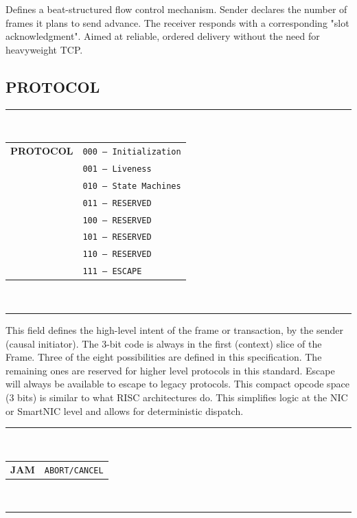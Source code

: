 \documentclass[../HFT-main.tex]{subfiles}
\begin{document}

Defines a beat-structured flow control mechanism.  Sender declares the number of frames it plans to send advance. The receiver responds with a corresponding "slot acknowledgment".  Aimed at reliable, ordered delivery without the need for heavyweight TCP.


\subsection{PROTOCOL}

\begin{margintable}
  \centering
  \vspace{12pt} 
  \footnotesize
  \rule{5.4cm}{0.8pt}\\
  \begin{tabular}{@{}cl@{}}
    \textbf{PROTOCOL} & \texttt{000 — Initialization} \\
                      & \texttt{001 — Liveness} \\
                      & \texttt{010 — State Machines} \\
                      & \texttt{011 — RESERVED} \\
                      & \texttt{100 — RESERVED} \\
                      & \texttt{101 — RESERVED} \\
                      & \texttt{110 — RESERVED} \\
                      & \texttt{111 — ESCAPE} \\
  \end{tabular}\\
  \rule{5.4cm}{0.6pt}
\end{margintable}

This field defines the high-level intent of the frame or transaction, by the sender (causal initiator). The 3-bit code is always in the first (context) slice of the Frame. Three of the eight possibilities are defined in this specification. The remaining ones are reserved for higher level protocols in this standard.  Escape will always be available to escape to legacy protocols. This compact opcode space (3 bits) is similar to what RISC architectures do. This simplifies logic at the NIC or SmartNIC level and allows for deterministic dispatch.

\begin{margintable}
  \centering
  \footnotesize
  \rule{5.4cm}{0.8pt}\\
  \begin{tabular}{@{}cl@{}}
    \textbf{JAM} & \texttt{ABORT/CANCEL} \\
  \end{tabular}\\
  \rule{5.4cm}{0.6pt}
\end{margintable}
\end{document}
